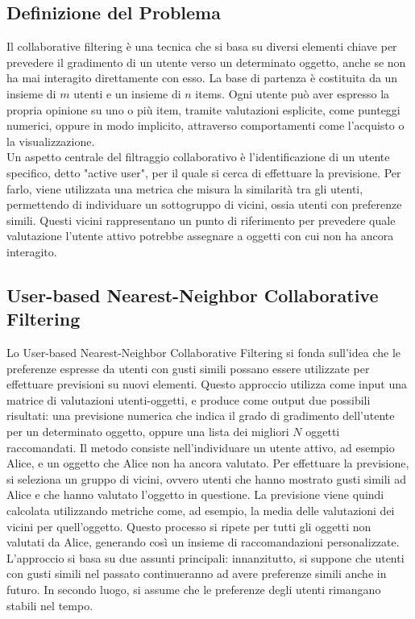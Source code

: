 \documentclass{report}
\begin{document}
	\subsection{Definizione del Problema}
	Il collaborative filtering è una tecnica che si basa su diversi elementi chiave per prevedere il gradimento di un utente verso un determinato oggetto, anche se non ha mai interagito direttamente con esso. La base di partenza è costituita da un insieme di $m$ utenti e un insieme di $n$ items. Ogni utente può aver espresso la propria opinione su uno o più item, tramite valutazioni esplicite, come punteggi numerici, oppure in modo implicito, attraverso comportamenti come l'acquisto o la visualizzazione.
	\vspace{\baselineskip}\\
	Un aspetto centrale del filtraggio collaborativo è l'identificazione di un utente specifico, detto "active user", per il quale si cerca di effettuare la previsione. Per farlo, viene utilizzata una metrica che misura la similarità tra gli utenti, permettendo di individuare un sottogruppo di vicini, ossia utenti con preferenze simili. Questi vicini rappresentano un punto di riferimento per prevedere quale valutazione l'utente attivo potrebbe assegnare a oggetti con cui non ha ancora interagito. 

	\subsection{User-based Nearest-Neighbor Collaborative Filtering}
	Lo User-based Nearest-Neighbor Collaborative Filtering si fonda sull'idea che le preferenze espresse da utenti con gusti simili possano essere utilizzate per effettuare previsioni su nuovi elementi. Questo approccio utilizza come input una matrice di valutazioni utenti-oggetti, e produce come output due possibili risultati: una previsione numerica che indica il grado di gradimento dell'utente per un determinato oggetto, oppure una lista dei migliori $N$ oggetti raccomandati. Il metodo consiste nell'individuare un utente attivo, ad esempio Alice, e un oggetto che Alice non ha ancora valutato. Per effettuare la previsione, si seleziona un gruppo di vicini, ovvero utenti che hanno mostrato gusti simili ad Alice e che hanno valutato l'oggetto in questione. La previsione viene quindi calcolata utilizzando metriche come, ad esempio, la media delle valutazioni dei vicini per quell'oggetto. Questo processo si ripete per tutti gli oggetti non valutati da Alice, generando così un insieme di raccomandazioni personalizzate. L'approccio si basa su due assunti principali: innanzitutto, si suppone che utenti con gusti simili nel passato continueranno ad avere preferenze simili anche in futuro. In secondo luogo, si assume che le preferenze degli utenti rimangano stabili nel tempo.
\end{document}
